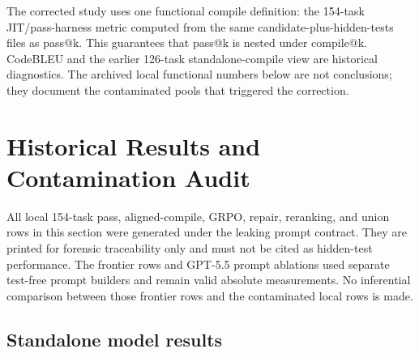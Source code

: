 \documentclass[11pt]{article}
\begin{document}
The corrected study uses one functional compile definition: the 154-task JIT/pass-harness metric computed from the same candidate-plus-hidden-tests files as pass@k. This guarantees that pass@k is nested under compile@k. CodeBLEU and the earlier 126-task standalone-compile view are historical diagnostics. The archived local functional numbers below are not conclusions; they document the contaminated pools that triggered the correction.

\section{Historical Results and Contamination Audit}

All local 154-task pass, aligned-compile, GRPO, repair, reranking, and union rows in this section were generated under the leaking prompt contract. They are printed for forensic traceability only and must not be cited as hidden-test performance. The frontier rows and GPT-5.5 prompt ablations used separate test-free prompt builders and remain valid absolute measurements. No inferential comparison between those frontier rows and the contaminated local rows is made.

\subsection{Standalone model results}
\end{document}
